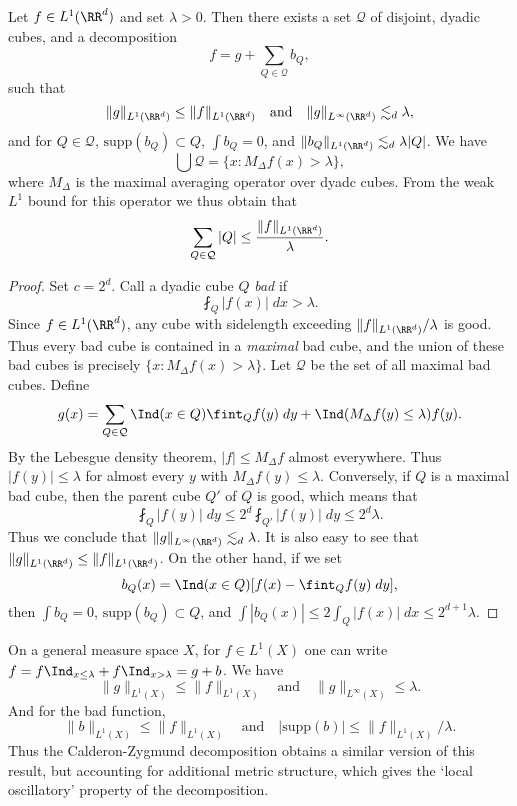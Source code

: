 \begin{theorem}
    Let $f \in L^1(\RR^d)$ and set $\lambda > 0$. Then there exists a set $\mathcal{Q}$ of disjoint, dyadic cubes, and a decomposition
    \[ f = g + \sum_{Q \in \mathcal{Q}} b_Q, \]
    such that
    \[ \| g \|_{L^1(\RR^d)} \leq \| f \|_{L^1(\RR^d)}  \quad\text{and}\quad   \| g \|_{L^\infty(\RR^d)} \lesssim_d \lambda, \]
    and for $Q \in \mathcal{Q}$, $\text{supp}(b_Q) \subset Q$, $\int b_Q = 0$, and $\| b_Q \|_{L^1(\RR^d)} \lesssim_d \lambda |Q|$. We have
    \[ \bigcup \mathcal{Q} = \{ x : M_\Delta f(x) > \lambda \}, \]
    where $M_\Delta$ is the maximal averaging operator over dyadc cubes. From the weak $L^1$ bound for this operator we thus obtain that
    \[ \sum_{Q \in \mathcal{Q}} |Q| \leq \frac{\| f \|_{L^1(\RR^d)}}{\lambda}. \]
\end{theorem}
\begin{proof}
    Set $c = 2^d$. Call a dyadic cube $Q$ \emph{bad} if
    \[ \fint_Q |f(x)|\; dx > \lambda. \]
    Since $f \in L^1(\RR^d)$, any cube with sidelength exceeding $\| f \|_{L^1(\RR^d)} / \lambda$ is good. Thus every bad cube is contained in a \emph{maximal} bad cube, and the union of these bad cubes is precisely $\{ x : M_\Delta f(x) > \lambda \}$. Let $\mathcal{Q}$ be the set of all maximal bad cubes. Define
    \[ g(x) = \sum_{Q \in \mathcal{Q}} \Ind(x \in Q) \fint_Q f(y)\; dy + \Ind(M_\Delta f(y) \leq \lambda) f(y). \]
    By the Lebesgue density theorem, $|f| \leq M_\Delta f$ almost everywhere. Thus $|f(y)| \leq \lambda$ for almost every $y$ with $M_\Delta f(y) \leq \lambda$. Conversely, if $Q$ is a maximal bad cube, then the parent cube $Q'$ of $Q$ is good, which means that
    \[ \fint_Q |f(y)|\; dy \leq 2^d \fint_{Q'} |f(y)|\; dy \leq 2^d \lambda. \]
    Thus we conclude that $\| g \|_{L^\infty(\RR^d)} \lesssim_d \lambda$. It is also easy to see that $\| g \|_{L^1(\RR^d)} \leq \| f \|_{L^1(\RR^d)}$. On the other hand, if we set
    \[ b_Q(x) = \Ind(x \in Q) [f(x) - \fint_Q f(y)\; dy], \]
    then $\int b_Q = 0$, $\text{supp}(b_Q) \subset Q$, and $\int |b_Q(x)| \leq 2 \int_Q |f(x)|\; dx \leq 2^{d+1} \lambda$.
\end{proof}

\begin{remark}
    On a general measure space $X$, for $f \in L^1(X)$ one can write $f = f \Ind_{x \leq \lambda} + f \Ind_{x > \lambda} = g + b$. We have
    \[ \| g \|_{L^1(X)} \leq \| f \|_{L^1(X)} \quad\text{and}\quad \| g \|_{L^\infty(X)} \leq \lambda. \]
    And for the bad function,
    \[ \| b \|_{L^1(X)} \leq \| f \|_{L^1(X)} \quad\text{and}\quad |\text{supp}(b)| \leq \| f \|_{L^1(X)} / \lambda. \]
    Thus the Calderon-Zygmund decomposition obtains a similar version of this result, but accounting for additional metric structure, which gives the `local oscillatory' property of the decomposition.
\end{remark}

